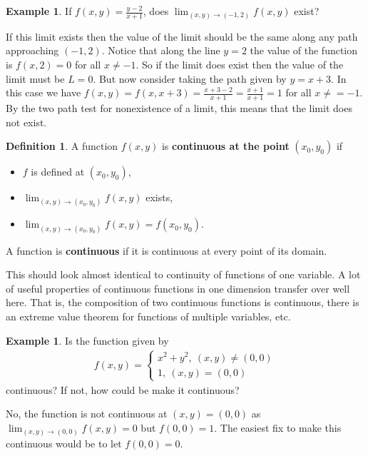 \documentclass[12pt, letter]{article}
\theoremstyle{plain}
\numberwithin{theorem}{section}
\theoremstyle{definition}
\newtheorem{definition}[theorem]{Definition}
\newtheorem{example}[theorem]{Example}
\begin{document}
\begin{example}
If $f(x,y) = \frac{y-2}{x+1}$, does $\lim_{(x,y) \to (-1,2)} f(x,y)$ exist?

\smallskip

If this limit exists then the value of the limit should be the same along any path approaching $(-1,2)$. Notice that along the line $y=2$ the value of the function is $f(x,2) = 0$ for all $x\neq -1$. So if the limit does exist then the value of the limit must be $L=0$. But now consider taking the path given by $y=x+3$. In this case we have $f(x,y) = f(x,x+3) = \frac{x+3-2}{x+1} = \frac{x+1}{x+1} = 1$ for all $x\neq =-1$. By the two path test for nonexistence of a limit, this means that the limit does not exist.
\end{example}

\bigskip

\hrulefill

\bigskip

\begin{definition}
A function $f(x,y)$ is \textbf{continuous at the point} $(x_0,y_0)$ if
\begin{itemize}
\item $f$ is defined at $(x_0,y_0)$,
\item $\lim_{(x,y) \to (x_0,y_0)} f(x,y)$ exists,
\item $\lim_{(x,y) \to (x_0,y_0)} f(x,y) = f(x_0,y_0)$.
\end{itemize}
A function is \textbf{continuous} if it is continuous at every point of its domain.
\end{definition}

\bigskip

This should look almost identical to continuity of functions of one variable. A lot of useful properties of continuous functions in one dimension transfer over well here. That is, the composition of two continuous functions is continuous, there is an extreme value theorem for functions of multiple variables, etc.

\bigskip

\hrulefill

\bigskip

\begin{example}
Is the function given by
\begin{align*}
f(x,y) = \begin{cases} x^2 + y^2, \ (x,y) \neq (0,0) \\ 1, \ (x,y) = (0,0) \end{cases}
\end{align*}
continuous? If not, how could be make it continuous?

\smallskip

No, the function is not continuous at $(x,y) = (0,0)$ as $\lim_{(x,y) \to (0,0)} f(x,y) = 0$ but $f(0,0) = 1$. The easiest fix to make this continuous would be to let $f(0,0) = 0$.
\end{example}
\end{document}
